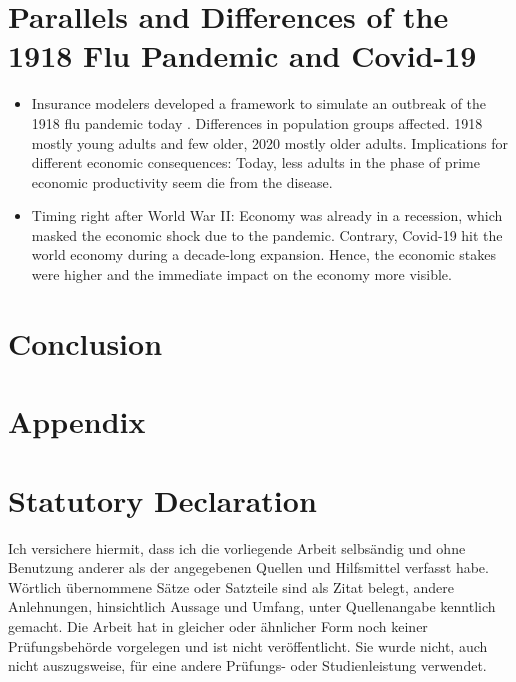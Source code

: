 \documentclass[12pt,a4paper]{article}
\begin{document}
\section{Parallels and Differences of the 1918 Flu Pandemic and Covid-19}
\begin{itemize}
	\item Insurance modelers developed a framework to simulate an outbreak of the 1918 flu pandemic today \citep{madhavModelingModernDay2013}. Differences in population groups affected. 1918 mostly young adults and few older, 2020 mostly older adults.	Implications for different economic consequences: Today, less adults in the phase of prime economic productivity seem die from the disease.
	\item Timing right after World War II: Economy was already in a recession, which masked the economic shock due to the pandemic.
	Contrary, Covid-19 hit the world economy during a decade-long expansion.
	Hence, the economic stakes were higher and the immediate impact on the economy more visible.
\end{itemize}






\section{Conclusion}

\clearpage
\appendix
\section{Appendix}

\clearpage


\newpage
\thispagestyle{empty}
\section*{Statutory Declaration}

Ich versichere hiermit, dass ich die vorliegende Arbeit selbs\"andig und ohne Benutzung anderer als der angegebenen Quellen und Hilfsmittel verfasst habe. W\"ortlich \"ubernommene S\"atze oder Satzteile sind als Zitat belegt, andere Anlehnungen, hinsichtlich Aussage und Umfang, unter Quellenangabe kenntlich gemacht. Die Arbeit hat in gleicher oder \"ahnlicher Form noch keiner Pr\"ufungsbeh\"orde vorgelegen und ist nicht ver\"offentlicht. Sie wurde nicht, auch nicht auszugsweise, f\"ur eine andere Pr\"ufungs- oder Studienleistung verwendet.
\end{document}
